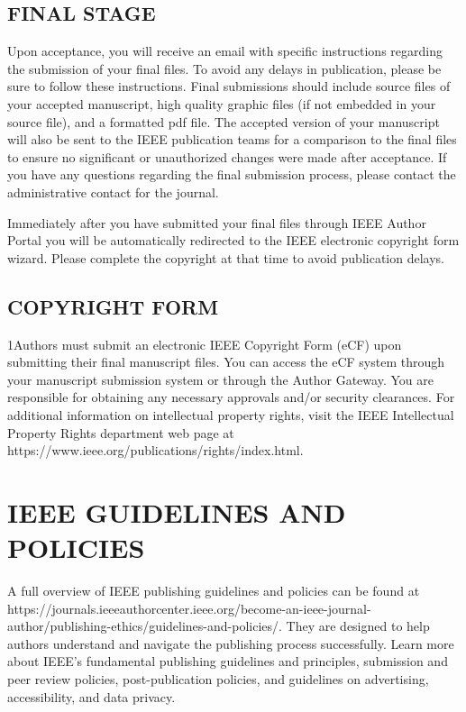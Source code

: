 \documentclass{ieeetj}
\begin{document}
\subsection{FINAL STAGE}
Upon acceptance, you will receive an email with specific instructions regarding the submission of your final files. To avoid any delays in publication, please be sure to follow these instructions. Final submissions should include source files of your accepted manuscript, high quality graphic files (if not embedded in your source file), and a formatted pdf file. The accepted version of your manuscript will also be sent to the IEEE publication teams for a comparison to the final files to ensure no significant or unauthorized changes were made after acceptance. If you have any questions regarding the final submission process, please contact the administrative contact for the journal. 

Immediately after you have submitted your final files through IEEE Author Portal you will be automatically redirected to the IEEE electronic copyright form wizard. Please complete the copyright at that time to avoid publication delays. 

\subsection{COPYRIGHT FORM}
\looseness1Authors must submit an electronic IEEE Copyright Form (eCF) upon submitting
their final manuscript files. You can access the eCF system through your
manuscript submission system or through the Author Gateway. You are
responsible for obtaining any necessary approvals and/or security
clearances. For additional information on intellectual property rights,
visit the IEEE Intellectual Property Rights department web page at
https://\discretionary{}{}{}www.ieee.org/\discretionary{}{}{}publications/\discretionary{}{}{}rights/\discretionary{}{}{}index.html.

\section{IEEE GUIDELINES AND POLICIES}

A full overview of IEEE publishing guidelines and policies can be found at https://journals.ieeeauthorcenter.ieee.org/become-an-ieee-journal-author/publishing-ethics/guidelines-and-policies/. They are designed to help authors understand and navigate the publishing process successfully. Learn more about IEEE's fundamental publishing guidelines and principles, submission and peer review policies, post-publication policies, and guidelines on advertising, accessibility, and data privacy.
\end{document}
